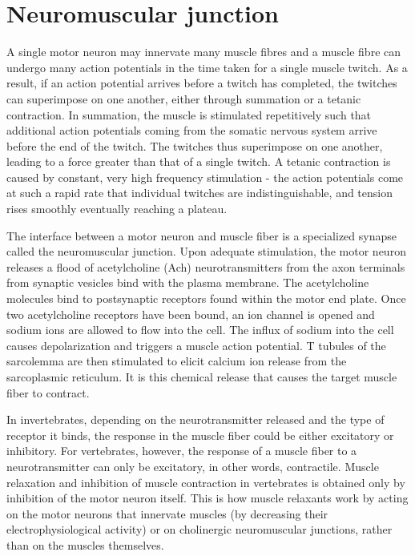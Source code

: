 \documentclass[]{book}
\begin{document}
\hypertarget{neuromuscular-junction}{%
\section{Neuromuscular junction}\label{neuromuscular-junction}}

A single motor neuron may innervate many muscle fibres and a muscle fibre can undergo many action potentials in the time taken for a single muscle twitch. As a result, if an action potential arrives before a twitch has completed, the twitches can superimpose on one another, either through summation or a tetanic contraction. In summation, the muscle is stimulated repetitively such that additional action potentials coming from the somatic nervous system arrive before the end of the twitch. The twitches thus superimpose on one another, leading to a force greater than that of a single twitch. A tetanic contraction is caused by constant, very high frequency stimulation - the action potentials come at such a rapid rate that individual twitches are indistinguishable, and tension rises smoothly eventually reaching a plateau.

The interface between a motor neuron and muscle fiber is a specialized synapse called the neuromuscular junction. Upon adequate stimulation, the motor neuron releases a flood of acetylcholine (Ach) neurotransmitters from the axon terminals from synaptic vesicles bind with the plasma membrane. The acetylcholine molecules bind to postsynaptic receptors found within the motor end plate. Once two acetylcholine receptors have been bound, an ion channel is opened and sodium ions are allowed to flow into the cell. The influx of sodium into the cell causes depolarization and triggers a muscle action potential. T tubules of the sarcolemma are then stimulated to elicit calcium ion release from the sarcoplasmic reticulum. It is this chemical release that causes the target muscle fiber to contract.

In invertebrates, depending on the neurotransmitter released and the type of receptor it binds, the response in the muscle fiber could be either excitatory or inhibitory. For vertebrates, however, the response of a muscle fiber to a neurotransmitter can only be excitatory, in other words, contractile. Muscle relaxation and inhibition of muscle contraction in vertebrates is obtained only by inhibition of the motor neuron itself. This is how muscle relaxants work by acting on the motor neurons that innervate muscles (by decreasing their electrophysiological activity) or on cholinergic neuromuscular junctions, rather than on the muscles themselves.
\end{document}
